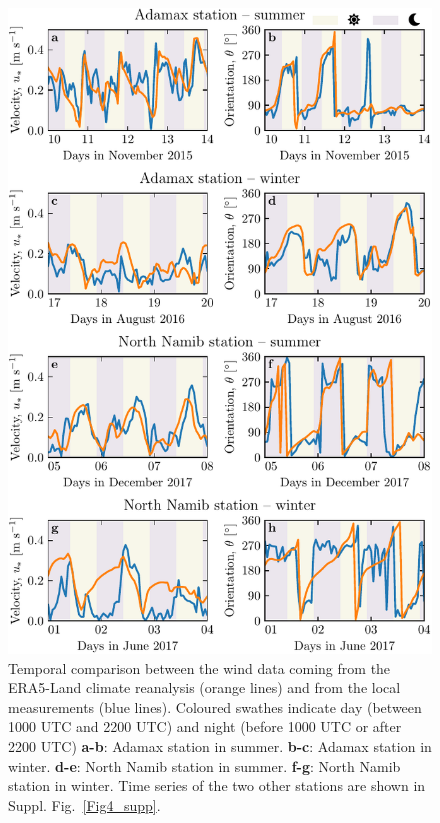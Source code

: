 \begin{figure}
\centering
\includegraphics[scale=1]{Figures/Figure2.pdf}
\caption{Temporal comparison between the wind data coming from the ERA5-Land climate reanalysis (orange lines) and from the local measurements (blue lines). Coloured swathes indicate day (between 1000 UTC and 2200 UTC) and night (before 1000 UTC or after 2200 UTC) \textbf{a-b}: Adamax station in summer. \textbf{b-c}: Adamax station in winter. \textbf{d-e}: North Namib station in summer. \textbf{f-g}: North Namib station in winter. Time series of the two other stations are shown in Suppl. Fig.~\ref{Fig4_supp}.}
\label{Fig2}
\end{figure}


